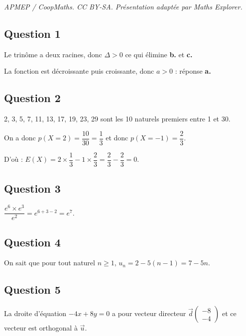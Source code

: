 \documentclass[10pt]{article}
\begin{document}
\noindent\textit{APMEP / CoopMaths. CC BY-SA. Présentation adaptée par Maths Explorer.}\par\medskip
\subsection*{Question 1}

Le trinôme a deux racines, donc \(\Delta > 0\) ce qui élimine \textbf{b.} et \textbf{c.}

La fonction est décroissante puis croissante, donc \(a > 0\) : réponse \textbf{a.}

\subsection*{Question 2}

2, 3, 5, 7, 11, 13, 17, 19, 23, 29 sont les 10 naturels premiers entre 1 et 30.
  
On a donc \(p(X = 2) = \dfrac{10}{30} = \dfrac{1}{3}\) et donc \(p(X = -1) = \dfrac{2}{3}\).

D'où : \(E(X) = 2 \times \dfrac{1}{3} - 1 \times \dfrac{2}{3} = \dfrac{2}{3} - \dfrac{2}{3} = 0.\)

\subsection*{Question 3}

\(\dfrac{e^6 \times e^3}{e^2} = e^{6+3-2} = e^7.\)

\subsection*{Question 4}

On sait que pour tout naturel \(n \geqslant 1\), \(u_n = 2 - 5(n - 1) = 7 - 5n\).

\subsection*{Question 5}

La droite d'équation \(-4x + 8y = 0\) a pour vecteur directeur \(\vec{d} \begin{pmatrix} -8 \\ -4 \end{pmatrix}\) et ce vecteur est orthogonal à \(\vec{u}\).
\end{document}
